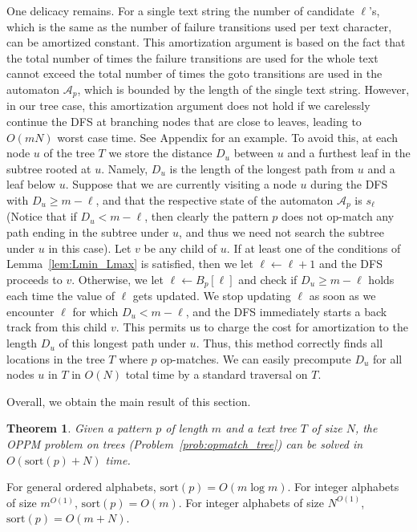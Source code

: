 \documentclass[a4paper,11pt]{article}
\newtheorem{theorem}{Theorem}
\newcommand{\sort}{\mathrm{sort}}
\begin{document}
One delicacy remains.
For a single text string
the number of candidate $\ell$'s,
which is the same as the number of failure transitions used per
text character, can be amortized constant.
This amortization argument is based on the fact that
the total number of times the failure transitions are used
for the whole text
cannot exceed the total number of times the goto transitions are used
in the automaton $\mathcal{A}_p$, which is bounded by the length
of the single text string.
However, in our tree case, this amortization argument does not hold
if we carelessly continue the DFS at branching nodes
that are close to leaves,
leading to $O(mN)$ worst case time.
See Appendix for an example.
To avoid this, at each node $u$ of the tree $T$
we store the distance $D_u$ between $u$ and a furthest leaf
in the subtree rooted at $u$.
Namely, $D_u$ is the length of the longest path from $u$ and a leaf below $u$.
Suppose that we are currently visiting a node $u$ during the DFS
with $D_u \geq m-\ell$,
and that the respective state of the automaton $\mathcal{A}_p$ is $s_\ell$
(Notice that if $D_u < m-\ell$, then clearly the pattern $p$ does not op-match
any path ending in the subtree under $u$,
and thus we need not search the subtree under $u$ in this case).
Let $v$ be any child of $u$.
If at least one of the conditions of Lemma~\ref{lem:Lmin_Lmax} is satisfied,
then we let $\ell \leftarrow \ell + 1$ and the DFS proceeds to $v$.
Otherwise, we let $\ell \leftarrow B_p[\ell]$
and check if $D_u \geq m-\ell$ holds each time the value of $\ell$ gets updated.
We stop updating $\ell$ as soon as
we encounter $\ell$ for which $D_u < m-\ell$,
and the DFS immediately starts a back track from this child $v$.
This permits us to charge the cost for amortization to
the length $D_u$ of this longest path under $u$.
Thus, this method correctly finds all locations in the tree $T$ where
$p$ op-matches.
We can easily precompute $D_u$ for all nodes $u$ in $T$
in $O(N)$ total time by a standard traversal on $T$.

Overall, we obtain the main result of this section.
\begin{theorem}
  Given a pattern $p$ of length $m$ and a text tree $T$ of size $N$,
  the OPPM problem on trees (Problem~\ref{prob:opmatch_tree})
  can be solved in $O(\sort(p) + N)$ time.
\end{theorem}
For general ordered alphabets, $\sort(p) = O(m \log m)$.
For integer alphabets of size $m^{O(1)}$, $\sort(p) = O(m)$.
For integer alphabets of size $N^{O(1)}$, $\sort(p) = O(m+N)$.
\end{document}
